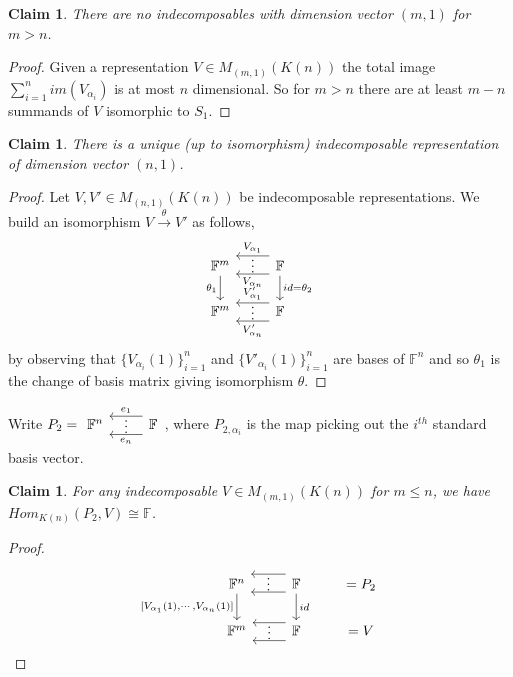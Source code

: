 \documentclass{book}
\newtheorem{claim}[theorem]{Claim}
\begin{document}
		\begin{claim}		
			There are no indecomposables with dimension vector $(m,1)$ for $m>n$.
		\end{claim}
		
		\begin{proof}
			Given a representation $V\in M_{(m,1)}(K(n))$ the total image $\displaystyle \sum_{i=1}^n im(V_{\alpha_i})$ is at most $n$ dimensional. So for $m>n$ there are at least $m-n$ summands of $V$ isomorphic to $S_1$.
		\end{proof}

		\begin{claim}		
			There is a unique (up to isomorphism) indecomposable representation of dimension vector $(n,1)$.
		\end{claim}
		
		\begin{proof}
			Let $V, V' \in M_{(n,1)}(K(n))$ be indecomposable representations. We build an isomorphism $V \xrightarrow{\theta} V'$ as follows,
			\[ \begin{tikzcd}
			\mathbb{F}^m \arrow[d, "\theta_1" '] &  \arrow[l, "V_{\alpha_1}"',yshift=1.8ex]  \arrow[l, phantom, "{\vdots}"',yshift=0.8ex]     \arrow[l,"V_{\alpha_n}",yshift=-1.2ex] 				\mathbb{F} \arrow{d}{id=\theta_2}  \\ 
			\mathbb{F}^m  &  \arrow[l, "V'_{\alpha_1}"',yshift=1.5ex]  \arrow[l, phantom, "{\vdots}"',yshift=0.5ex]     \arrow[l,"V'_{\alpha_n}",yshift=-1.5ex] \mathbb{F}
			\end{tikzcd}\]
			by observing that $\{ V_{\alpha_i}(1)\}^n_{i=1}$ and $\{ V'_{\alpha_i}(1)\}^n_{i=1} $ are bases of $\mathbb{F}^n$ and so $\theta_1$ is the change of basis matrix giving isomorphism $\theta$.

		\end{proof}
	
		Write $P_2= \begin{tikzcd}
			\mathbb{F}^n  &   \arrow[l, "e_1"',yshift=1.5ex]  \arrow[l, phantom, "{\vdots}"',yshift=.5ex]     \arrow[l,"e_n",yshift=-1.5ex] \mathbb{F}
			\end{tikzcd}$, where $P_{2,\alpha_i}$ is the map picking out the $i^{th}$ standard basis vector. 

		\begin{claim}		
			For any indecomposable $V \in M_{(m,1)}(K(n))$ for $m\leq n$, we have $Hom_{K(n)}(P_2,V) \cong \mathbb{F}$.
		\end{claim}
		
		\begin{proof}
			\[ \begin{tikzcd}
			\mathbb{F}^n \arrow[d, "{[V_{\alpha_1}(1), \cdots ,V_{\alpha_n}(1)]}"' ] &  \arrow[l, yshift=1.8ex]  \arrow[l, phantom, "{\vdots}"',yshift=0.8ex]     							\arrow[l,yshift=-1.2ex] \mathbb{F} \arrow{d}{id} & = P_2  \\ 
			\mathbb{F}^m  &  \arrow[l, yshift=1.5ex]  \arrow[l, phantom, "{\vdots}"',yshift=0.5ex]     \arrow[l, yshift=-1.5ex] \mathbb{F} & = V
			\end{tikzcd}\]

		\end{proof}
\end{document}
